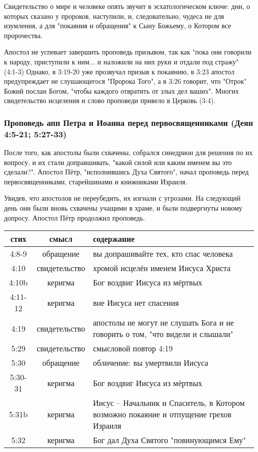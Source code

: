 Свидетельство о мире и человеке опять звучит в эсхатологическом ключе: дни, о которых сказано у пророков, наступили, и, следовательно, чудеса не для изумления, а для "покаяния и обращения" к Сыну Божьему, о Котором все пророчества.

Апостол не успевает завершить проповедь призывом, так как "пока они говорили к народу, приступили к ним... и наложили на них руки и отдали под стражу" (4:1-3)
Однако, в 3:19-20 уже прозвучал призыв к покаянию, в 3:23 апостол предупреждает не слушающегося "Пророка Того", а в 3:26 говорит, что "Отрок" Божий послан Богом, "чтобы каждого отвратить от злых дел ваших".
Многих свидетельство исцеления и слово проповеди привело в Церковь (3:4).  


\subsubsection*{Проповедь апп Петра и Иоанна перед первосвященниками (Деян 4:5-21; 5:27-33)}
После того, как апостолы были схвачены, собрался синедрион для решения по их вопросу, и их стали доправшивать, "какой силой или каким именем вы это сделали?".
Апостол Пётр, "исполнившись Духа Святого", начал проповедь перед первосвященниками, старейшинами и книжниками Израиля.


Увидев, что апостолов не переубедить, их изгнали с угрозами.
На следующий день они были вновь схвачены учащими в храме, и были подвергнуты новому допросу.
Апостол Пётр продолжил проповедь.

\begin{center}
	\begin{longtable}{ |c|c|p{}| } 
		\hline
		стих & смысл & содержание \\
		\hline\hline
		4:8-9 & обращение & вы допрашивайте тех, кто спас человека \\
		4:10 & свидетельство & хромой исцелён именем Иисуса Христа \\
		4:10b & керигма & Бог воздвиг Иисуса из мёртвых \\
		4:11-12 & керигма & вне Иисуса нет спасения \\
		4:19 & свидетельство & апостолы не могут не слушать Бога и не говорить о том, "что видели и слышали" \\
		5:29 & свидетельство & смысловой повтор 4:19 \\
		5:30 & обращение & обличение: вы умертвили Иисуса \\
		5:30-31 & керигма & Бог воздвиг Иисуса из мёртвых \\
		5:31b & керигма & Иисус – Начальник и Спаситель, в Котором возможно покаяние и отпущение грехов Израиля \\
		5:32 & керигма & Бог дал Духа Святого "повинующимся Ему" \\
		\hline
	\end{longtable}
\end{center}

